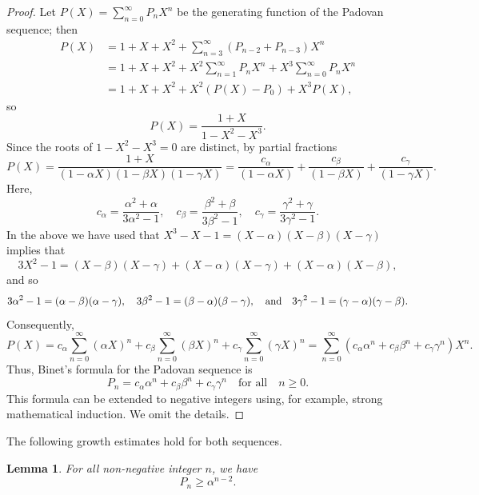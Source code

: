 \documentclass[11pt,a4paper]{article}
\newtheorem{lemma}[theorem]{Lemma}
\numberwithin{equation}{section}
\numberwithin{table}{section}
\numberwithin{figure}{section}
\begin{document}
\begin{proof}
Let $P(X)=\displaystyle\sum_{n=0}^{\infty}P_{n}X^{n}$ be the generating function of the Padovan sequence; then
\begin{align*}
P(X)&=1+X+X^{2}+\displaystyle\sum_{n=3}^{\infty}(P_{n-2}+P_{n-3})X^{n}\\
&=1+X+X^{2}+X^{2}\displaystyle\sum_{n=1}^{\infty}P_{n}X^{n}+X^{3}\displaystyle\sum_{n=0}^{\infty}P_{n}X^{n}\\
&=1+X+X^{2}+X^{2}(P(X)-P_{0})+X^{3}P(X),
\end{align*}
so
\begin{equation*}
P(X)=\frac{1+X}{1-X^{2}-X^{3}}.
\end{equation*}
Since the roots of $1-X^{2}-X^{3}=0$ are distinct, by partial fractions
\begin{equation*}
P(X)=\frac{1+X}{(1-\alpha X)(1-\beta X)(1-\gamma X)}=\frac{c_{\alpha}}{(1-\alpha X)}+\frac{c_{\beta}}{(1-\beta X)}+ \frac{c_{\gamma}}{(1-\gamma X)}.
\end{equation*}
Here,
$$
c_{\alpha}=\frac{\alpha^{2}+\alpha}{3\alpha^{2}-1},\quad c_{\beta}=\frac{\beta^{2}+\beta}{3\beta^{2}-1},\quad c_{\gamma}=\frac{\gamma^{2}+\gamma}{3\gamma^{2}-1}.
$$
In the above we have used that $X^{3}-X-1=(X-\alpha)(X-\beta)(X-\gamma)$ implies that 
$$
3X^{2}-1=(X-\beta)(X-\gamma)+(X-\alpha)(X-\gamma)+(X-\alpha)(X-\beta),
$$ 
and so 
$$
3\alpha^{2}-1=(\alpha -\beta )(\alpha -\gamma),\quad 3\beta^{2}-1=(\beta -\alpha )(\beta -\gamma),\quad {\text{\rm  and}}\quad 3\gamma^{2}-1=(\gamma -\alpha )(\gamma -\beta).
$$ 
Consequently,
\begin{equation*}
P(X)=c_{\alpha}\displaystyle \sum_{n=0}^{\infty}(\alpha X)^{n}+c_{\beta}\displaystyle \sum_{n=0}^{\infty}(\beta X)^{n}+c_{\gamma}\displaystyle \sum_{n=0}^{\infty}(\gamma X)^{n}=\displaystyle \sum_{n=0}^{\infty}(c_{\alpha}\alpha^{n}+c_{\beta}\beta^{n}+c_{\gamma}\gamma^{n})X^{n}.
\end{equation*}
Thus, Binet's formula for the Padovan sequence is
$$
P_{n}=c_{\alpha}\alpha^n + c_{\beta}\beta^n + c_{\gamma}\gamma^n\quad \text{for all}\quad n\ge 0.
$$
This formula can be extended to negative integers using, for example, strong mathematical induction. We omit the details.
\end{proof}

The following growth estimates hold for both sequences.

\begin{lemma}\label{lem:growth_P}
	For all non-negative integer $n$, we have
	\begin{equation*}
		 P_n \ge \alpha^{n-2}.
	\end{equation*}
\end{lemma}
\end{document}
